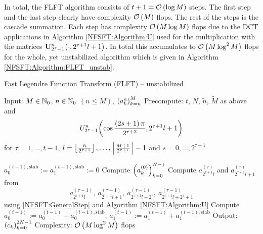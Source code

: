 In total, the FLFT algorithm consists of $t+1 = \mathcal{O}\left(\log M\right)$ steps. The first step and the last step clearly have complexity $\mathcal{O}\left(M\right)$ flops. The rest of the steps is the cascade summation. Each step has complexity $\mathcal{O}\left(M \log M\right)$ flops due to the DCT applications in Algorithm \ref{NFSFT:Algorithm:U} used for the multiplication with the matrices ${\mathbf{U}_{2^{\tau}-1}^{n}{\hspace{-0.4ex}}\left(\cdot,2^{\tau+1}l+1\right)}$. In total this accumulates to $\mathcal{O}\left(M \log^2 M\right)$ flops for the whole, yet unstabilized algorithm which is given in Algorithm 
\ref{NFSFT:Algorithm:FLFT_unstab}.

\begin{algorithm}[tb]
  \caption{Fast Legendre Function Transform (FLFT) -- unstabilized}
  \label{NFSFT:Algorithm:FLFT_unstab}    
  \begin{algorithmic}
    \STATE Input:  $M \in \mathbb{N}_{0}$, $n \in \mathbb{N}_{0}$ $(n \le M)$, $\left(a_k^n\right)_{k=n}^{M}$
    \STATE Precompute: $t$, $N$, $\tilde{n}$, $\tilde{M}$ as above and \[U_{2^{\tau}-1}^{n}{\hspace{-0.4ex}}\left(\cos \frac{\left(2s+1\right)\pi}{2^{\tau+2}}, 2^{\tau+1}l+1\right)\] 
    \STATE {} for $\tau = 1,\ldots,t-1$, $l = \left\lfloor\frac{\tilde{n}}{2^{\tau+1}}\right\rfloor,\ldots,\left\lceil\frac{\tilde{M}+1}{2^{\tau+1}}\right\rceil-1$ and $s = 0,\ldots,2^{\tau+1}$
    \STATE {} 

    \STATE $a_{0}^{(t-1),\text{stab}} := a_{1}^{(t-1),\text{stab}} := 0$
    \STATE Compute $\left(a_{k}^{(0)}\right)_{k=0}^{N-1}$ 
        \STATE Compute $a_{2^{\tau+1}l}^{(\tau)}$ and $a_{2^{\tau+1}l+1}^{(\tau)}$ from \[a_{2^{\tau+1}l}^{(\tau-1)},\  
          a_{2^{\tau+1}l+1}^{(\tau-1)},\ a_{2^{\tau+1}l+2^{\tau}}^{(\tau-1)},\ a_{2^{\tau+1}l+2^{\tau}+1}^{(\tau-1)}\] using 
          \eqref{NFSFT:GeneralStep} and Algorithm \ref{NFSFT:Algorithm:U}
      \ENDFOR
    \ENDFOR
    \STATE Compute $a_{0}^{(t-1)} := a_{0}^{(t-1)} + a_{0}^{(t-1),\text{stab}}$, $a_{1}^{(t-1)} := a_{1}^{(t-1)} + a_{1}^{(t-1),\text{stab}}$
    \STATE Output: $\left(c_{k}\right)_{k=0}^{2N-1}$
    \STATE Complexity: $\mathcal{O}\left(M \log^2 M\right)$ flops
\end{algorithmic}
\end{algorithm}

